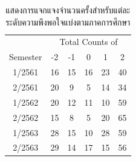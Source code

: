 \begin{table}[]
    \centering
    \begin{tabular}{@{}cccccc@{}}
    \toprule
                               & \multicolumn{5}{c}{Total Counts of}                                                                                                         \\ \cmidrule(l){2-6} 
    \multirow{-2}{*}{Semester} & \cellcolor[HTML]{F8696B}-2 & \cellcolor[HTML]{FAB2B5}-1 & \cellcolor[HTML]{FCFCFF}0 & \cellcolor[HTML]{B0DDBD}1 & \cellcolor[HTML]{63BE7B}2 \\ \midrule
    1/2561                     & 16                         & 15                         & 16                        & 23                        & 40                        \\
    2/2561                     & 20                         & 9                          & 5                         & 14                        & 34                        \\
    1/2562                     & 20                         & 12                         & 11                        & 10                        & 59                        \\
    2/2562                     & 15                         & 8                          & 5                         & 20                        & 65                        \\
    1/2563                     & 28                         & 15                         & 10                        & 28                        & 59                        \\
    2/2563                     & 29                         & 14                         & 17                        & 15                        & 56                        \\ \bottomrule
    \end{tabular}%
    \caption{แสดงการแจกแจงจำนวนครั้งสำหรับแต่ละระดับความพึงพอใจแบ่งตามภาคการศึกษา}
    \label{tab:eval_result_2}
\end{table}

